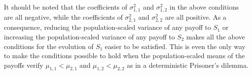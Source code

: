 \documentclass[11pt]{article}
\begin{document}
It should be noted that the coefficients of $\sigma^2_{1,1}$ and $\sigma^2_{1,2}$ in the above conditions are all negative, while the coefficients of $\sigma^2_{2,1}$ and $\sigma^2_{2,2}$ are all positive. As a consequence, reducing the population-scaled variance of any payoff to $S_1$ or increasing the population-scaled variance of any payoff to $S_2$ makes all the above conditions for the evolution of $S_1$ easier to be satisfied. This is even the only way to make the conditions possible to hold when the population-scaled means of the payoffs verify $\mu_{1,1}<\mu_{2,1}$ and $\mu_{1,2}<\mu_{2,2}$ as in a deterministic Prisoner's dilemma.

\end{document}
